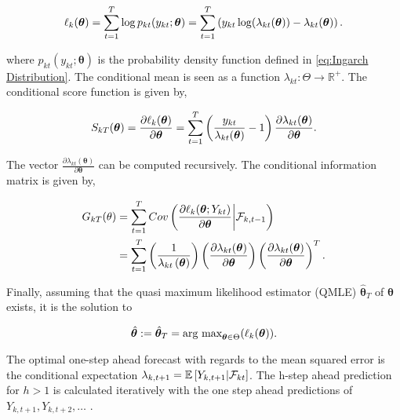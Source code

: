 \begin{equation}
\ell_k(\bm{\theta}) = \sum_{t=1}^T\log p_{kt}(y_{kt};\bm{\theta}) = \sum_{t=1}^T \left(y_{kt}\log(\lambda_{kt}(\bm{\theta})) - \lambda_{kt}(\bm{\theta})\right).
\label{eq: Quasi log likelihood}
\end{equation}

where $p_{kt}(y_{kt};\bm{\theta})$ is the probability density function defined in \ref{eq:Ingarch Distribution}. The conditional mean is seen as a function $\lambda_{kt}: \Theta \rightarrow \mathbb{R}^{+}$. The conditional score function is given by,

\begin{equation}
S_{kT}(\bm{\theta}) = \frac{\partial \ell_k(\bm{\theta})}{\partial \bm{\theta}} = \sum_{t=1}^T\left(\frac{y_{kt}}{\lambda_{kt}(\bm{\theta})}-1\right)\frac{\partial\lambda_{kt}(\bm{\theta})}{\partial \bm{\theta}}.
\label{eq:conditional score}
\end{equation}

The vector $\frac{\partial\lambda_{kt}(\bm{\theta})}{\partial \bm{\theta}}$ can be computed recursively. 
The conditional information matrix is given by, 

\begin{align}
G_{kT}(\theta) &= \sum_{t=1}^T Cov\left(\frac{\partial \ell_k(\bm{\theta}; Y_{kt})}{\partial \bm{\theta}} \middle| \mathcal{F}_{k,t-1}\right) \\
&=  \sum_{t=1}^T \left(\frac{1}{\lambda_{kt}\left(\bm{\theta}\right)}\right) \left(\frac{\partial \lambda_{kt}(\bm{\theta})}{\partial \bm{\theta}}\right)\left(\frac{\partial \lambda_{kt}(\bm{\theta})}{\partial \bm{\theta}}\right)^T.
\label{eq:conditional information matrix}
\end{align}

Finally, assuming that the quasi maximum likelihood estimator (QMLE) $\hat{\bm{\theta}}_T$ of $\bm{\theta}$ exists, it is the solution to 

\begin{equation}
\hat{\bm{\theta}}:= \hat{\bm{\theta}}_T = \text{arg max}_{\bm{\theta} \in \Theta} (\ell_k(\bm{\theta})). 
\label{eq:ingarch qmle}
\end{equation}

The optimal one-step ahead forecast with regards to the mean squared error is the conditional expectation $\lambda_{k,t+1}=\mathbb{E}\left[Y_{k,t+1} | \mathcal{F}_{kt} \right]$. The h-step ahead prediction for $h>1$ is calculated iteratively with the one step ahead predictions of $Y_{k,t+1},Y_{k,t+2},\ldots$ \cite{Liboschik:2016}. 

